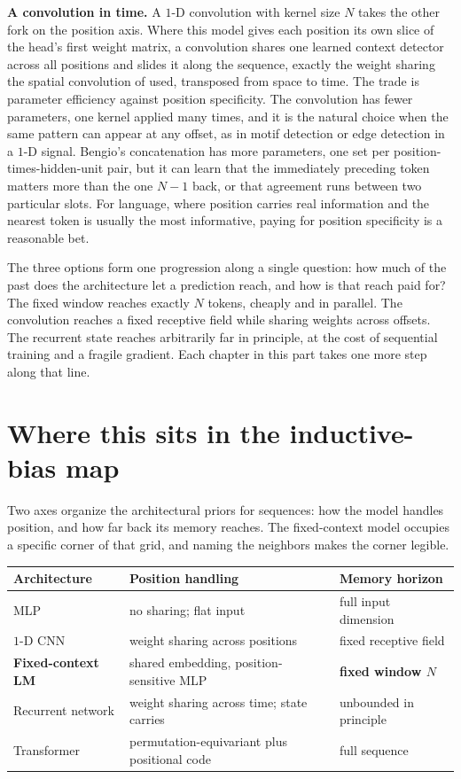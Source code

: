 \textbf{A convolution in time.} A $1$-D convolution with kernel size $N$
takes the other fork on the position axis. Where this model gives each
position its own slice of the head's first weight matrix, a convolution
shares one learned context detector across all positions and slides it
along the sequence, exactly the weight sharing the spatial convolution of
 used, transposed from space to time. The trade is parameter
efficiency against position specificity. The convolution has fewer
parameters, one kernel applied many times, and it is the natural choice
when the same pattern can appear at any offset, as in motif detection or
edge detection in a $1$-D signal. Bengio's concatenation has more
parameters, one set per position-times-hidden-unit pair, but it can learn
that the immediately preceding token matters more than the one $N-1$ back,
or that agreement runs between two particular slots. For language, where
position carries real information and the nearest token is usually the most
informative, paying for position specificity is a reasonable bet.

The three options form one progression along a single question: how much
of the past does the architecture let a prediction reach, and how is that
reach paid for? The fixed window reaches exactly $N$ tokens, cheaply and in
parallel. The convolution reaches a fixed receptive field while sharing
weights across offsets. The recurrent state reaches arbitrarily far in
principle, at the cost of sequential training and a fragile gradient. Each
chapter in this part takes one more step along that line.

\section{Where this sits in the inductive-bias map}\label{sec:bengio-map}

Two axes organize the architectural priors for sequences: how the model
handles position, and how far back its memory reaches. The fixed-context
model occupies a specific corner of that grid, and naming the neighbors
makes the corner legible.

\begin{center}
\begin{tabular}{@{}lll@{}}
\toprule
Architecture & Position handling & Memory horizon \\
\midrule
MLP & no sharing; flat input & full input dimension \\
$1$-D CNN & weight sharing across positions & fixed receptive field \\
\textbf{Fixed-context LM} & shared embedding, position-sensitive MLP
  & \textbf{fixed window $N$} \\
Recurrent network & weight sharing across time; state carries
  & unbounded in principle \\
Transformer & permutation-equivariant plus positional code
  & full sequence \\
\bottomrule
\end{tabular}
\end{center}

